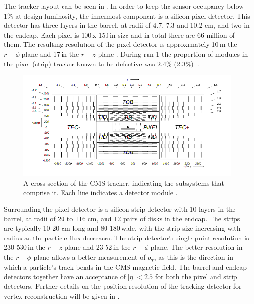 The tracker layout can be seen in . In order to keep the sensor occupancy below 1\% at design luminosity, the innermost component is a silicon pixel detector. This detector has three layers in the barrel, at radii of 4.7, 7.3 and 10.2 cm, and two in the endcap. Each pixel is 100\micron\,x 150\micron\,in size and in total there are 66 million of them. The resulting resolution of the pixel detector is approximately 10\micron\,in the $r-\phi$ plane and 17\micron\,in the $r-z$ plane \cite{trackerperformance}. During run 1 the proportion of modules in the pixel (strip) tracker known to be defective was 2.4\% (2.3\%)~\cite{}.

\begin{figure}
  \includegraphics[width=1.2\largefigwidth]{plots/detector/TrackerSchematic.png}
  \caption{A cross-section of the CMS tracker, indicating the subsystems that comprise it. Each line indicates a detector module \cite{Chatrchyan:2008aa}.}
  \label{fig:trackerschematic}
\end{figure}



Surrounding the pixel detector is a silicon strip detector with 10 layers in the barrel, at radii of 20 to 116 cm, and 12 pairs of disks in the endcap. The strips are typically 10-20 cm long and 80-180\micron\,wide, with the strip size increasing with radius as the particle flux decreases. The strip detector's single point resolution is 230-530\micron\,in the $r-z$ plane and 23-52\micron\,in the $r-\phi$ plane.  The better resolution in the $r-\phi$ plane allows a better measurement of $p_{T}$, as this is the direction in which a particle's track bends in the CMS magnetic field. The barrel and endcap detectors together have an acceptance of $|\eta|<2.5$ for both the pixel and strip detectors. Further details on the position resolution of the tracking detector for vertex reconstruction will be given in .

